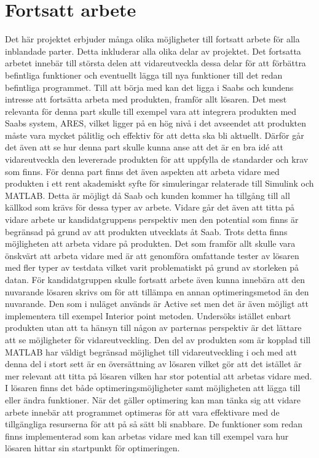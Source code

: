 \section{Fortsatt arbete}
Det här projektet erbjuder många olika möjligheter till fortsatt arbete för alla inblandade parter. Detta inkluderar alla olika delar av projektet. Det fortsatta arbetet innebär till största delen att vidareutveckla dessa delar för att förbättra befintliga funktioner och eventuellt lägga till nya funktioner till det redan befintliga programmet. 
\newline \newline
Till att börja med kan det ligga i Saabs och kundens intresse att fortsätta arbeta med produkten, framför allt lösaren. Det mest relevanta för denna part skulle till exempel vara att integrera produkten med Saabs system, ARES, vilket ligger på en hög nivå i det avseendet att produkten måste vara mycket pålitlig och effektiv för att detta ska bli aktuellt. Därför går det även att se hur denna part skulle kunna anse att det är en bra idé att vidareutveckla den levererade produkten för att uppfylla de standarder och krav som finns. För denna part finns det även aspekten att arbeta vidare med produkten i ett rent akademiskt syfte för simuleringar relaterade till Simulink och MATLAB. Detta är möjligt då Saab och kunden kommer ha tillgång till all källkod som krävs för dessa typer av arbete.
\newline \newline
Vidare går det även att titta på vidare arbete ur kandidatgruppens perspektiv men den potential som finns är begränsad på grund av att produkten utvecklats åt Saab. Trots detta finns möjligheten att arbeta vidare på produkten. Det som framför allt skulle vara önskvärt att arbeta vidare med är att genomföra omfattande tester av lösaren med fler typer av testdata vilket varit problematiskt på grund av storleken på datan. För kandidatgruppen skulle fortsatt arbete även kunna innebära att den nuvarande lösaren skrivs om för att tillämpa en annan optimeringsmetod än den nuvarande. Den som i nuläget används är Active set men det är även möjligt att implementera till exempel Interior point metoden.
\newline \newline
Undersöks istället enbart produkten utan att ta hänsyn till någon av parternas perspektiv är det lättare att se möjligheter för vidareutveckling. Den del av produkten som är kopplad till MATLAB har väldigt begränsad möjlighet till vidareutveckling i och med att denna del i stort sett är en översättning av lösaren vilket gör att det istället är mer relevant att titta på lösaren vilken har stor potential att arbetas vidare med. I lösaren finns det både optimeringsmöjligheter samt möjligheten att lägga till eller ändra funktioner. När det gäller optimering kan man tänka sig att vidare arbete innebär att programmet optimeras för att vara effektivare med de tillgängliga resurserna för att på så sätt bli snabbare. De funktioner som redan finns implementerad som kan arbetas vidare med kan till exempel vara hur lösaren hittar sin startpunkt för optimeringen.
